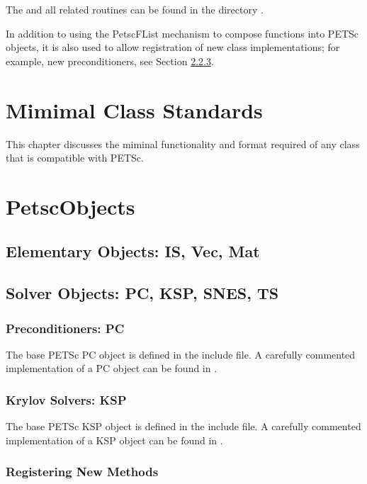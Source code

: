 \documentclass[twoside,12pt]{../sty/report_petsc}
\begin{document}
The  and all related routines can be found in the directory
.

In addition to using the PetscFList mechanism to compose functions into PETSc objects, it is
also used to allow registration of new class implementations; for example, new
preconditioners, see Section \ref{sec:registeringnewmethods}. 

\chapter{Mimimal Class Standards}
This chapter discusses the miminal functionality and format required of any 
class that is compatible with PETSc. 

\chapter{PetscObjects}

\section{Elementary Objects: IS, Vec, Mat}

\section{Solver Objects: PC, KSP, SNES, TS}

\subsection{Preconditioners: PC}

The base PETSc PC object is defined in the  include file. 
A carefully commented implementation of a PC object can be found in 
. 


\subsection{Krylov Solvers: KSP}
The base PETSc KSP object is defined in the  include file. 
A carefully commented implementation of a KSP object can be found in 
. 

\subsection{Registering New Methods}
\label{sec:registeringnewmethods}
\end{document}
